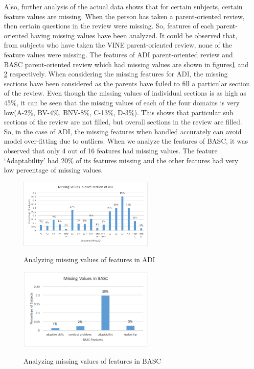 Also, further analysis of the actual data shows that for certain subjects, certain feature values are missing. When the person has taken a parent-oriented review, then certain questions in the review were missing. So, features of each parent-oriented having missing values have been analyzed. It could be observed that, from subjects who have taken the VINE parent-oriented review, none of the feature values were missing. The features of ADI parent-oriented review and BASC parent-oriented review which had missing values are shown in figures\ref{fig:ADI} and \ref{fig:BASC} respectively. When considering the missing features for ADI, the missing sections have been considered as the parents have failed to fill a particular section of the review. Even though the missing values of individual sections is as high as 45\%, it can be seen that the missing values of each of the four domains is very low(A-2\%, BV-4\%, BNV-8\%, C-13\%, D-3\%). This shows that particular sub sections of the review are not filled, but overall sections in the review are filled. So, in the case of ADI, the missing features when handled accurately can avoid model over-fitting due to outliers. When we analyze the features of BASC, it was observed that only 4 out of 16 features had missing values. The feature `Adaptability' had 20\% of its features missing and the other features had very low percentage of missing values.
\begin{figure}
\centering
  {\includegraphics[width=0.6\textwidth]{Figures/Figure_3_4.png}}
  \caption{Analyzing missing values of features in ADI}
  \label{fig:ADI}
\end{figure}
\begin{figure}
\centering
  {\includegraphics[width=0.6\textwidth]{Figures/Figure_3_5.png}}
  \caption{Analyzing missing values of features in BASC}
  \label{fig:BASC}
\end{figure}
